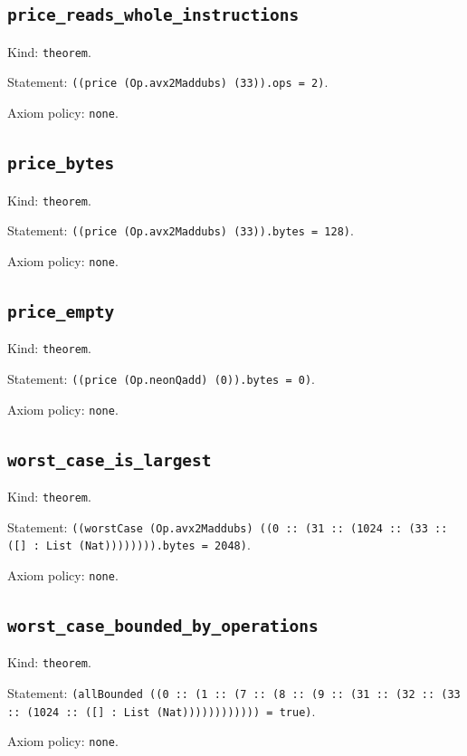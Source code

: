 \documentclass[11pt]{article}
\begin{document}
\subsection*{\texttt{price\_reads\_whole\_instructions}}
\noindent Kind: \texttt{theorem}.\par
\noindent Statement: \texttt{((price (Op.avx2Maddubs) (33)).ops = 2)}.\par
\noindent Axiom policy: \texttt{none}.\par
\subsection*{\texttt{price\_bytes}}
\noindent Kind: \texttt{theorem}.\par
\noindent Statement: \texttt{((price (Op.avx2Maddubs) (33)).bytes = 128)}.\par
\noindent Axiom policy: \texttt{none}.\par
\subsection*{\texttt{price\_empty}}
\noindent Kind: \texttt{theorem}.\par
\noindent Statement: \texttt{((price (Op.neonQadd) (0)).bytes = 0)}.\par
\noindent Axiom policy: \texttt{none}.\par
\subsection*{\texttt{worst\_case\_is\_largest}}
\noindent Kind: \texttt{theorem}.\par
\noindent Statement: \texttt{((worstCase (Op.avx2Maddubs) ((0 :: (31 :: (1024 :: (33 :: ([] : List (Nat)))))))).bytes = 2048)}.\par
\noindent Axiom policy: \texttt{none}.\par
\subsection*{\texttt{worst\_case\_bounded\_by\_operations}}
\noindent Kind: \texttt{theorem}.\par
\noindent Statement: \texttt{(allBounded ((0 :: (1 :: (7 :: (8 :: (9 :: (31 :: (32 :: (33 :: (1024 :: ([] : List (Nat)))))))))))) = true)}.\par
\noindent Axiom policy: \texttt{none}.\par
\end{document}
